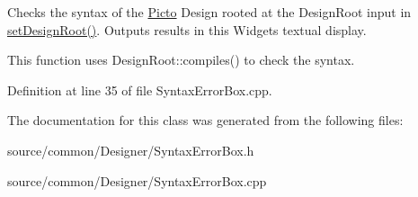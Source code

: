 Checks the syntax of the \hyperlink{namespace_picto}{Picto} Design rooted at the Design\-Root input in \hyperlink{class_syntax_error_box_ae28581de605e6916f103c7ded7cba7cc}{set\-Design\-Root()}. Outputs results in this Widgets textual display. 

This function uses Design\-Root\-::compiles() to check the syntax. 

Definition at line 35 of file Syntax\-Error\-Box.\-cpp.



The documentation for this class was generated from the following files\-:\begin{DoxyCompactItemize}
\item 
source/common/\-Designer/Syntax\-Error\-Box.\-h\item 
source/common/\-Designer/Syntax\-Error\-Box.\-cpp\end{DoxyCompactItemize}
